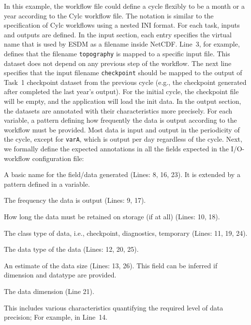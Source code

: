 \documentclass{superfri}
\begin{document}
In this example, the workflow file could define a cycle flexibly to be a month or a year according to the Cylc workflow file.
The notation is similar to the specification of Cylc workflows using a nested INI format.
For each task, inputs and outputs are defined.
In the input section, each entry specifies the virtual name that is used by ESDM as a filename inside NetCDF.
Line~3, for example, defines that the filename \texttt{topography} is mapped to a specific input file.
This dataset does not depend on any previous step of the workflow.
The next line specifies that the input filename \texttt{checkpoint} should be mapped to the output of Task~1 checkpoint dataset from the previous cycle (e.g., the checkpoint generated after completed the last year's output).
For the initial cycle, the checkpoint file will be empty, and the application will load the init data.
In the output section, the datasets are annotated with their characteristics more precisely.
For each variable, a pattern defining how frequently the data is output according to the workflow must be provided.
Most data is input and output in the periodicity of the cycle, except for \texttt{varA}, which is output per day regardless of the cycle.
Next, we formally define the expected annotations in all the fields expected in the I/O-workflow configuration file:

\begin{description}[itemsep=0pt]
  \item[Name] A basic name for the field/data generated (Lines: 8, 16, 23). It is extended by a pattern defined in a variable.
  \item[Pattern] The frequency the data is output (Lines: 9, 17).

  \item[Lifetime] How long the data must be retained on storage (if at all) (Lines: 10, 18).

  \item[Type] The class type of data, i.e., checkpoint, diagnostics, temporary (Lines: 11, 19, 24).

  \item[Datatype] The data type of the data (Lines: 12, 20, 25).

  \item[Size] An estimate of the data size (Lines: 13, 26). This field can be inferred if dimension and datatype are provided.

  \item[Dimension] The data dimension (Line 21).

  \item[Accuracy] This includes various characteristics quantifying the required level of data precision; For example, in Line~14.

\end{description}
\end{document}
